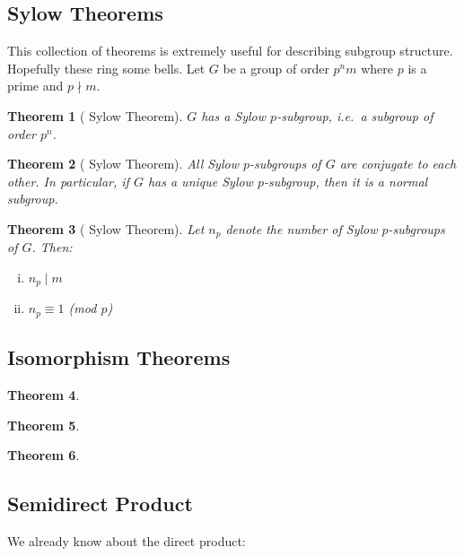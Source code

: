 \documentclass[a4paper, oneside, 12pt, final]{article}
\newtheorem{theorem}{Theorem}[section]
\theoremstyle{definition}
\begin{document}
\subsection{Sylow Theorems}
This collection of theorems is extremely useful for describing subgroup structure.
Hopefully these ring some bells.
Let \(G\) be a group of order \(p^n m\) where \(p\) is a prime and \(p\nmid m\).
\begin{theorem}[ Sylow Theorem]\label{thm:sylow1}
    \(G\) has a Sylow \(p\)-subgroup, i.e.\ a subgroup of order \(p^n\).
\end{theorem}
\begin{theorem}[ Sylow Theorem]\label{thm:sylow2}
    All Sylow \(p\)-subgroups of \(G\) are conjugate to each other.
    In particular, if \(G\) has a unique Sylow \(p\)-subgroup, then it is a normal subgroup.
\end{theorem}
\begin{theorem}[ Sylow Theorem]\label{thm:sylow3}
    Let \(n_p\) denote the number of Sylow \(p\)-subgroups of \(G\).
    Then:
    \begin{enumerate}[(i)]
        \item \(n_p \mid m\)
        \item \(n_p\equiv 1\) (mod \(p\))
    \end{enumerate}
\end{theorem}

\subsection{Isomorphism Theorems}
\begin{theorem}\label{thm:iso1}
\end{theorem}

\begin{theorem}\label{thm:iso2}
\end{theorem}

\begin{theorem}\label{thm:iso3}
\end{theorem}

\subsection{Semidirect Product}
We already know about the direct product:
\end{document}
